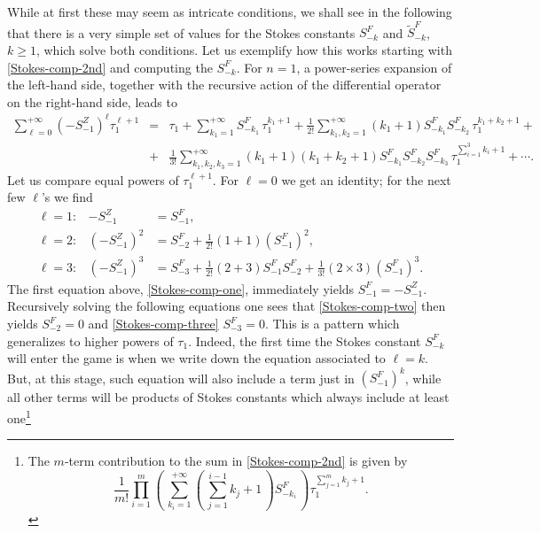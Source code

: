 \documentclass[11pt,a4paper]{article}
\begin{document}
%
\noindent
While at first these may seem as intricate conditions, we shall see in the following that there is a very simple set of values for the Stokes constants $S_{-k}^F$ and $\widetilde{S}_{-k}^F$, $k\ge1$, which solve both conditions. Let us exemplify how this works starting with \eqref{Stokes-comp-2nd} and computing the $S_{-k}^F$. For $n=1$, a power-series expansion of the left-hand side, together with the recursive action of the differential operator on the right-hand side, leads to
%
\begin{eqnarray}
\label{Stokes-comp-powers-tau1}
\sum_{\ell=0}^{+\infty} \left(-S_{-1}^{Z}\right)^{\ell} \tau_{1}^{\ell+1} & = & \tau_{1} + \sum_{k_{1}=1}^{+\infty} S_{-k_{1}}^{F}\, \tau_{1}^{k_{1}+1} + \frac{1}{2!} \sum_{k_{1},k_{2}=1}^{+\infty} \left( k_{1}+1 \right) S_{-k_{1}}^{F} S_{-k_{2}}^{F}\, \tau_{1}^{k_{1}+k_{2}+1} + \\
&+&
\frac{1}{3!} \sum_{k_{1},k_{2},k_{3}=1}^{+\infty} \left( k_{1}+1 \right) \left( k_{1}+k_{2}+1 \right) S_{-k_{1}}^{F} S_{-k_{2}}^{F} S_{-k_{3}}^{F}\, \tau_{1}^{\sum_{i=1}^{3}k_{i}+1} + \cdots.
\nonumber
\end{eqnarray}
%
\noindent
Let us compare equal powers of $\tau_1^{\ell+1}$. For $\ell=0$ we get an identity; for the next few $\ell$'s we find
%
\begin{eqnarray}
\label{Stokes-comp-one}
\ell = 1: & -S_{-1}^{Z} & = S_{-1}^{F}, \\
\label{Stokes-comp-two}
\ell = 2: & \left( -S_{-1}^{Z} \right)^{2} & = S_{-2}^{F} + \frac{1}{2!} \left( 1+1 \right) \left( S_{-1}^{F} \right)^{2}, \\
\label{Stokes-comp-three}
\ell = 3: & \left( -S_{-1}^{Z} \right)^{3} & = S_{-3}^{F} + \frac{1}{2!} \left( 2+3 \right) S_{-1}^{F} S_{-2}^{F} + \frac{1}{3!} \left( 2 \times 3 \right) \left( S_{-1}^{F} \right)^{3}.
\end{eqnarray}
%
\noindent
The first equation above, \eqref{Stokes-comp-one}, immediately yields $S_{-1}^{F} = -S_{-1}^{Z}$. Recursively solving the following equations one sees that \eqref{Stokes-comp-two} then yields $S_{-2}^{F} =0$ and \eqref{Stokes-comp-three} $S_{-3}^{F} =0$. This is a pattern which generalizes to higher powers of $\tau_1$. Indeed, the first time the Stokes constant $S_{-k}^F$ will enter the game is when we write down the equation associated to $\ell=k$. But, at this stage, such equation will also include a term just in $\left(S_{-1}^F\right)^k$, while all other terms will be products of Stokes constants which always include at least one\footnote{The $m$-term contribution to the sum in \eqref{Stokes-comp-2nd} is given by
%
\begin{equation}
\frac{1}{m!} \prod_{i=1}^{m} \left(\, \sum_{k_{i}=1}^{+\infty} \left(\, \sum_{j=1}^{i-1}k_{j}+1\, \right) S_{-k_{i}}^{F}\, \right) \tau_{1}^{\sum_{j=1}^{m}k_{j}+1}.
\end{equation}
} 
\end{document}
